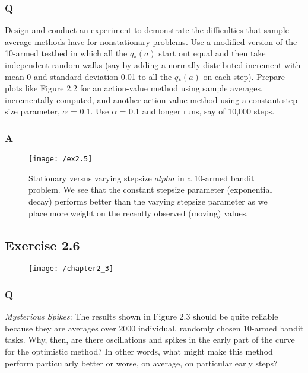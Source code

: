 \subsubsection*{Q}
Design and conduct an experiment to demonstrate the difficulties that sample-average methods have for nonstationary problems. Use a modified version of the 10-armed testbed in which all the \(q_*(a)\) start out equal and then take independent random walks (say by adding a normally distributed increment with mean 0 and standard deviation 0.01 to all the \(q_*(a)\)  on each step). Prepare plots like Figure 2.2 for an action-value method using sample averages, incrementally computed, and another action-value method using a constant step-size parameter, \(\alpha\) = 0.1. Use \(\alpha\) = 0.1 and longer runs, say of 10,000 steps.

\subsubsection*{A}
\ProgrammingExercise
\begin{figure}[h!]
	\centering
	\texttt{[image: /ex2.5]}
	\caption{Stationary versus varying stepsize \(alpha\) in a 10-armed bandit problem. We see that the constant stepsize parameter (exponential decay) performs better than the varying stepsize parameter as we place more weight on the recently observed (moving) values.}
	\label{fig:ex2.5}
\end{figure}

\subsection{Exercise 2.6}
\begin{figure}[h!]
	\centering
	\texttt{[image: /chapter2\_3]}
	\caption{}
	\label{fig:chapter2_3}
\end{figure}

\subsubsection*{Q}
\textit{Mysterious Spikes}: The results shown in Figure 2.3 should be quite reliable because they are averages over 2000 individual, randomly chosen 10-armed bandit tasks. Why, then, are there oscillations and spikes in the early part of the curve for the optimistic
method? In other words, what might make this method perform particularly better or worse, on average, on particular early steps?

